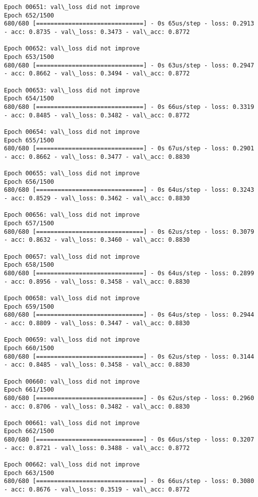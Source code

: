 \documentclass[11pt]{article}
\begin{document}
\begin{Verbatim}[commandchars=\\\{\}]
Epoch 00651: val\_loss did not improve
Epoch 652/1500
680/680 [==============================] - 0s 65us/step - loss: 0.2913 - acc: 0.8735 - val\_loss: 0.3473 - val\_acc: 0.8772

Epoch 00652: val\_loss did not improve
Epoch 653/1500
680/680 [==============================] - 0s 63us/step - loss: 0.2947 - acc: 0.8662 - val\_loss: 0.3494 - val\_acc: 0.8772

Epoch 00653: val\_loss did not improve
Epoch 654/1500
680/680 [==============================] - 0s 66us/step - loss: 0.3319 - acc: 0.8485 - val\_loss: 0.3482 - val\_acc: 0.8772

Epoch 00654: val\_loss did not improve
Epoch 655/1500
680/680 [==============================] - 0s 67us/step - loss: 0.2901 - acc: 0.8662 - val\_loss: 0.3477 - val\_acc: 0.8830

Epoch 00655: val\_loss did not improve
Epoch 656/1500
680/680 [==============================] - 0s 64us/step - loss: 0.3243 - acc: 0.8529 - val\_loss: 0.3462 - val\_acc: 0.8830

Epoch 00656: val\_loss did not improve
Epoch 657/1500
680/680 [==============================] - 0s 62us/step - loss: 0.3079 - acc: 0.8632 - val\_loss: 0.3460 - val\_acc: 0.8830

Epoch 00657: val\_loss did not improve
Epoch 658/1500
680/680 [==============================] - 0s 64us/step - loss: 0.2899 - acc: 0.8956 - val\_loss: 0.3458 - val\_acc: 0.8830

Epoch 00658: val\_loss did not improve
Epoch 659/1500
680/680 [==============================] - 0s 64us/step - loss: 0.2944 - acc: 0.8809 - val\_loss: 0.3447 - val\_acc: 0.8830

Epoch 00659: val\_loss did not improve
Epoch 660/1500
680/680 [==============================] - 0s 62us/step - loss: 0.3144 - acc: 0.8485 - val\_loss: 0.3458 - val\_acc: 0.8830

Epoch 00660: val\_loss did not improve
Epoch 661/1500
680/680 [==============================] - 0s 62us/step - loss: 0.2960 - acc: 0.8706 - val\_loss: 0.3482 - val\_acc: 0.8830

Epoch 00661: val\_loss did not improve
Epoch 662/1500
680/680 [==============================] - 0s 66us/step - loss: 0.3207 - acc: 0.8721 - val\_loss: 0.3488 - val\_acc: 0.8772

Epoch 00662: val\_loss did not improve
Epoch 663/1500
680/680 [==============================] - 0s 66us/step - loss: 0.3080 - acc: 0.8676 - val\_loss: 0.3519 - val\_acc: 0.8772


\end{Verbatim}
\end{document}
